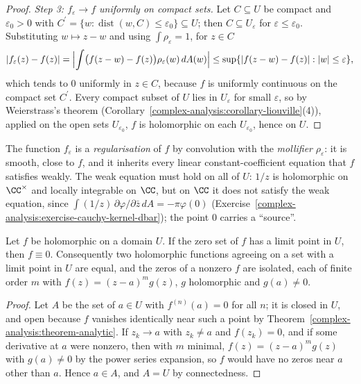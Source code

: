 \begin{proof}
\emph{Step 3: $f_\varepsilon \to f$ uniformly on compact sets.} Let $C \subseteq U$ be compact and $\varepsilon_0 > 0$ with $C^{\prime} = \{w : \operatorname{dist}(w, C) \leq \varepsilon_0\} \subseteq U$; then $C \subseteq U_\varepsilon$
for $\varepsilon \leq \varepsilon_0$. Substituting $w \mapsto z - w$ and using $\int\rho_\varepsilon = 1$, for $z \in C$
\[
|f_\varepsilon(z) - f(z)| = \Bigl|\int\bigl(f(z - w) - f(z)\bigr)\rho_\varepsilon(w)\,dA(w)\Bigr| \leq \sup\{|f(z - w) - f(z)| : |w| \leq \varepsilon\},
\]
which tends to $0$ uniformly in $z \in C$, because $f$ is uniformly continuous on the compact set $C^{\prime}$. Every compact subset of $U$ lies in $U_\varepsilon$ for small $\varepsilon$, so by Weierstrass's theorem
(Corollary~\ref{complex-analysis:corollary-liouville}(4)), applied on the open sets $U_{\varepsilon_0}$, $f$ is holomorphic on each $U_{\varepsilon_0}$, hence on $U$.
\end{proof}

The function $f_\varepsilon$ is a \emph{regularisation} of $f$ by convolution with the \emph{mollifier} $\rho_\varepsilon$: it is smooth, close to $f$, and it inherits every linear constant-coefficient equation that $f$
satisfies weakly. The weak equation must hold on all of $U$: $1/z$ is holomorphic on $\CC^\times$ and locally integrable on $\CC$, but on $\CC$ it does not satisfy the weak equation, since
$\int(1/z)\,\partial\varphi/\partial\bar z\,dA = -\pi\varphi(0)$ (Exercise~\ref{complex-analysis:exercise-cauchy-kernel-dbar}); the point $0$ carries a ``source''.

\begin{theorem}\label{complex-analysis:theorem-identity}
Let $f$ be holomorphic on a domain $U$. If the zero set of $f$ has a limit point in $U$, then $f \equiv 0$. Consequently two holomorphic functions agreeing on a set with a limit point in $U$ are equal, and
the zeros of a nonzero $f$ are isolated, each of finite order $m$ with $f(z) = (z - a)^mg(z)$, $g$ holomorphic and $g(a) \neq 0$.
\end{theorem}

\begin{proof}
Let $A$ be the set of $a \in U$ with $f^{(n)}(a) = 0$ for all $n$; it is closed in $U$, and open because $f$ vanishes identically near such a point by
Theorem~\ref{complex-analysis:theorem-analytic}. If $z_k \to a$ with $z_k \neq a$ and $f(z_k) = 0$, and if some derivative at $a$ were nonzero, then with $m$ minimal, $f(z) = (z - a)^mg(z)$ with $g(a) \neq 0$
by the power series expansion, so $f$ would have no zeros near $a$ other than $a$. Hence $a \in A$, and $A = U$ by connectedness.
\end{proof}

